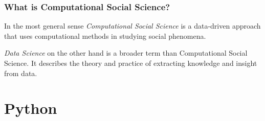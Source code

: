\documentclass{beamer}
\begin{document}
\begin{frame}
    \frametitle{What is Computational Social Science?}
    \begin{definition}{}
        In the most general sense \emph{Computational Social Science} is a data-driven approach that uses computational methods in studying social phenomena.
    \end{definition}
    \begin{definition}{}
        \emph{Data Science} on the other hand is a broader term than Computational Social Science. It describes the theory and practice of extracting knowledge and insight from data.
    \end{definition}


\end{frame}

\section{Python}
\end{document}
